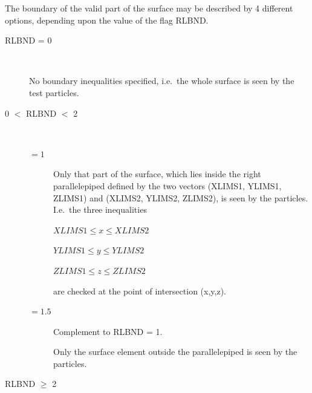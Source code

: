 The boundary of the valid part of the surface may be described by 4 different
options, depending upon the value of the flag RLBND.
\begin{description}
  \item[RLBND = 0] ~ 

        No boundary inequalities specified, i.e.\ the whole surface is seen by the test
        particles.
  \item[0  $<$	 RLBND	$<$   2] ~ 

        \begin{description}
          \item[$= 1$] Only that part of the surface, which lies
                inside the right parallelepiped defined by the two vectors (XLIMS1, YLIMS1,
                ZLIMS1) and (XLIMS2, YLIMS2, ZLIMS2), is seen by the particles.
                I.e.\ the three inequalities 

                $XLIMS1 \le x \le XLIMS2$ 

                $YLIMS1 \le y \le YLIMS2$ 

                $ZLIMS1 \le z \le ZLIMS2$ 

                are checked at the point of intersection (x,y,z).
          \item[$= 1.5$] Complement to RLBND = 1.

                Only the surface element outside the parallelepiped is seen by the particles.
        \end{description}
  \item[RLBND $\ge$ 2] ~ 


\end{description}
